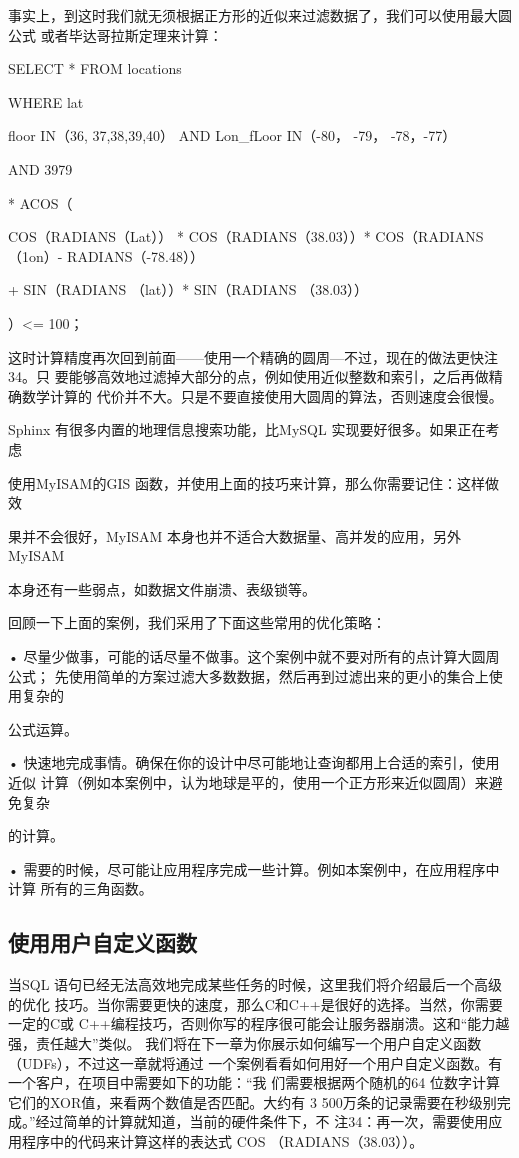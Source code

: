 事实上，到这时我们就无须根据正方形的近似来过滤数据了，我们可以使用最大圆公式
或者毕达哥拉斯定理来计算：

SELECT * FROM locations

WHERE lat

floor IN（36, 37,38,39,40） AND Lon\_fLoor IN（-80， -79， -78，-77）

AND 3979

* ACOS（

COS（RADIANS（Lat）） * COS（RADIANS（38.03））* COS（RADIANS（1on）- RADIANS（-78.48））

+ SIN（RADIANS （lat））* SIN（RADIANS （38.03））

）<= 100；

这时计算精度再次回到前面——使用一个精确的圆周—不过，现在的做法更快注34。只
要能够高效地过滤掉大部分的点，例如使用近似整数和索引，之后再做精确数学计算的
代价并不大。只是不要直接使用大圆周的算法，否则速度会很慢。

Sphinx 有很多内置的地理信息搜索功能，比MySQL 实现要好很多。如果正在考虑

使用MyISAM的GIS 函数，并使用上面的技巧来计算，那么你需要记住：这样做效

果并不会很好，MyISAM 本身也并不适合大数据量、高并发的应用，另外 MyISAM

本身还有一些弱点，如数据文件崩溃、表级锁等。

回顾一下上面的案例，我们采用了下面这些常用的优化策略：

• 尽量少做事，可能的话尽量不做事。这个案例中就不要对所有的点计算大圆周公式；
先使用简单的方案过滤大多数数据，然后再到过滤出来的更小的集合上使用复杂的

公式运算。

• 快速地完成事情。确保在你的设计中尽可能地让查询都用上合适的索引，使用近似
计算（例如本案例中，认为地球是平的，使用一个正方形来近似圆周）来避免复杂

的计算。

• 需要的时候，尽可能让应用程序完成一些计算。例如本案例中，在应用程序中计算
所有的三角函数。

\subsection{使用用户自定义函数}
当SQL 语句已经无法高效地完成某些任务的时候，这里我们将介绍最后一个高级的优化
技巧。当你需要更快的速度，那么C和C++是很好的选择。当然，你需要一定的C或
C++编程技巧，否则你写的程序很可能会让服务器崩溃。这和“能力越强，责任越大”类似。
我们将在下一章为你展示如何编写一个用户自定义函数（UDFs），不过这一章就将通过
一个案例看看如何用好一个用户自定义函数。有一个客户，在项目中需要如下的功能：“我
们需要根据两个随机的64 位数字计算它们的XOR值，来看两个数值是否匹配。大约有
3 500万条的记录需要在秒级别完成。”经过简单的计算就知道，当前的硬件条件下，不
注34：再一次，需要使用应用程序中的代码来计算这样的表达式 COS （RADIANS（38.03））。

